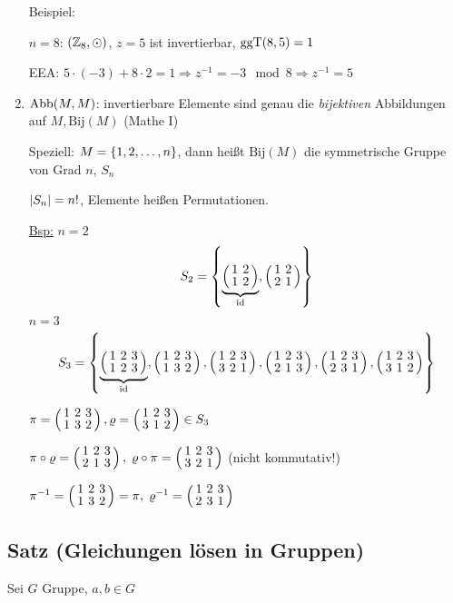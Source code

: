 \begin{enumerate}
	Beispiel:
	
	$n=8$: $(\mathbb{Z}_8, \odot)$, $z=5$ ist invertierbar, $\mathrm{ ggT }(8, 5) = 1$
	
	EEA: $5 \cdot (-3) + 8 \cdot 2 = 1 \Rightarrow z^{-1} = -3 \mod 8 \Rightarrow z^{-1} = 5$


	\item
	$\mathrm{ Abb }(M, M)$: invertierbare Elemente sind genau die \emph{bijektiven} Abbildungen auf $M, \mathrm{Bij}(M)$ (Mathe I)
	
	Speziell: $M = \left\{1, 2, \dots, n\right\}$, dann heißt $\mathrm{Bij}(M)$ die symmetrische Gruppe von Grad $n$, $S_n$
	
	$\left|S_n\right| = n!$, Elemente heißen Permutationen.
	
	\underline{Bsp:} $n=2$
	\[S_2= \aset{
	\underbrace{\aMatrix{cc}{
	1 & 2 \\ 
	1 & 2}}_{\id},
	\aMatrix{cc}{
	1 & 2 \\
	2 & 1}}\]
	$n=3$
	\[S_3 = \aset{
	\underbrace{\sPer{1}{2}{3}}_{\id},
	\sPer{1}{3}{2},
	\sPer{3}{2}{1},
	\sPer{2}{1}{3},
	\sPer{2}{3}{1},
	\sPer{3}{1}{2}
	}\]
	
	$\pi = \sPer{1}{3}{2}, \varrho = \sPer{3}{1}{2} \in S_3$
	
	$\pi \circ \varrho = \sPer{2}{1}{3},\; \varrho \circ \pi = \sPer{3}{2}{1}$ (nicht kommutativ!)
	
	$\pi^{-1} = \sPer{1}{3}{2} = \pi,\; \varrho^{-1}= \sPer{2}{3}{1}$
\end{enumerate}

\subsection[Satz: Gleichungen lösen in Gruppen]{Satz (Gleichungen lösen in Gruppen)} \label{gLösenGruppen}

	Sei $G$ Gruppe, $a, b \in G$
	
